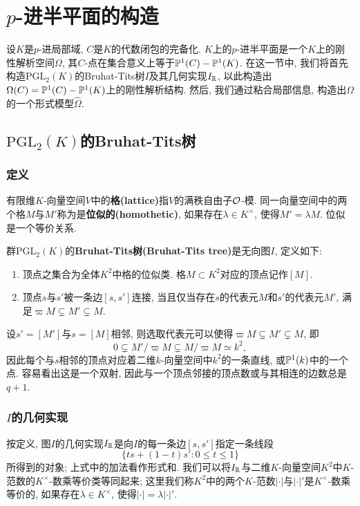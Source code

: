 \section{$p$-进半平面的构造}

设$K$是$p$-进局部域, $C$是$K$的代数闭包的完备化.
$K$上的$p$-进半平面是一个$K$上的刚性解析空间$\Omega$,
其$C$-点在集合意义上等于$\P^1(C)-\P^1(K)$.
在这一节中, 我们将首先构造$\mathrm{PGL}_2(K)$的Bruhat-Tits树$I$及其几何实现$I_\R$, 以此构造出$\Omega(C) = \P^1(C) - \P^1(K)$上的刚性解析结构.
然后, 我们通过粘合局部信息, 构造出$\Omega$的一个形式模型$\hat{\Omega}$.

\subsection{$\mathrm{PGL}_2(K)$的Bruhat-Tits树}

\subsubsection{定义}
有限维$K$-向量空间$V$中的\textbf{格(lattice)}指$V$的满秩自由子$\O$-模.
同一向量空间中的两个格$M$与$M'$称为是\textbf{位似的(homothetic)}, 如果存在$\lambda\in K^\times$, 使得$M' = \lambda M$.
位似是一个等价关系.
\begin{definition}
    群$\mathrm{PGL}_2(K)$的\textbf{Bruhat-Tits树(Bruhat-Tits tree)}是无向图$I$, 定义如下:
    \begin{enumerate}
        \item [\myit] 顶点之集合为全体$K^2$中格的位似类. 格$M\subset K^2$对应的顶点记作$[M]$.
        \item [\myit] 顶点$s$与$s'$被一条边$[s, s']$连接, 当且仅当存在$s$的代表元$M$和$s'$的代表元$M'$, 满足$\varpi M \subsetneq M'\subsetneq M$.
    \end{enumerate}
\end{definition}

设$s' = [M']$与$s = [M]$相邻, 则选取代表元可以使得$\varpi M\subsetneq M' \subsetneq M$,
即\[0\subsetneq M'/\varpi M\subsetneq M/\varpi M\simeq k^2,\]
因此每个与$s$相邻的顶点对应着二维$k$-向量空间中$k^2$的一条直线,
或$\P^1(k)$中的一个点. 容易看出这是一个双射, 因此与一个顶点邻接的顶点数或与其相连的边数总是$q+1$.


\subsubsection{$I$的几何实现}
按定义, 图$I$的几何实现$I_\R$是向$I$的每一条边$[s, s']$指定一条线段\[\{ts + (1-t)s' : 0\le t\le 1\}\]所得到的对象; 上式中的加法看作形式和.
我们可以将$I_\R$与二维$K$-向量空间$K^2$中$K$-范数的$K^\times$-数乘等价类等同起来;
这里我们称$K^2$中的两个$K$-范数$|\cdot|$与$|\cdot|'$是$K^\times$-数乘等价的, 如果存在$\lambda\in K^\times$, 使得$|\cdot| = \lambda|\cdot|'$.

